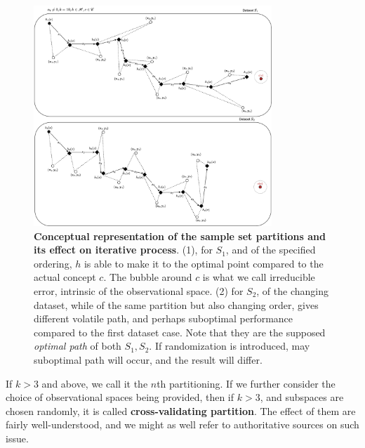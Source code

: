 \documentclass[10pt,oneside,oldfontcommands,dvipsnames,article]{memoir}
\begin{document}
\begin{figure}[htb]
    \centering
    \includegraphics[width=0.8\textwidth]{img/optimization_train_loss_data.png}
    \caption{\textbf{Conceptual representation of the sample set partitions and its effect on iterative process}. (1), for $S_{1}$, and of the specified ordering, $h$ is able to make it to the optimal point compared to the actual concept $c$. The bubble around $c$ is what we call irreducible error, intrinsic of the observational space. (2) for $S_{2}$, of the changing dataset, while of the same partition but also changing order, gives different volatile path, and perhaps suboptimal performance compared to the first dataset case. Note that they are the supposed \textit{optimal path} of both $S_{1},S_{2}$. If randomization is introduced, may suboptimal path will occur, and the result will differ.}
    \label{fig:randomwalk_descent}
\end{figure}

If $k>3$ and above, we call it the $n$th partitioning. If we further consider the choice of observational spaces being provided, then if $k>3$, and subspaces are chosen randomly, it is called \textbf{cross-validating partition}. The effect of them are fairly well-understood, and we might as well refer to authoritative sources on such issue. 
\end{document}
